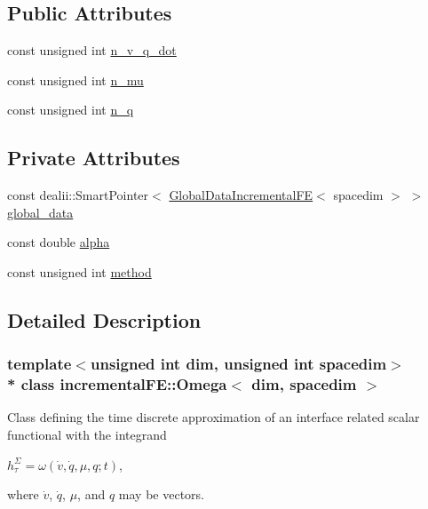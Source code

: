 \subsection*{Public Attributes}
\begin{DoxyCompactItemize}
\item 
const unsigned int \hyperlink{classincremental_f_e_1_1_omega_a7fa938b26804b0dc15726f3423332880}{n\+\_\+v\+\_\+q\+\_\+dot}
\item 
const unsigned int \hyperlink{classincremental_f_e_1_1_omega_a322340b50451ab46f91cdcec95248f16}{n\+\_\+mu}
\item 
const unsigned int \hyperlink{classincremental_f_e_1_1_omega_addbf75c949792f6340ea40164a2bfee3}{n\+\_\+q}
\end{DoxyCompactItemize}
\subsection*{Private Attributes}
\begin{DoxyCompactItemize}
\item 
const dealii\+::\+Smart\+Pointer$<$ \hyperlink{classincremental_f_e_1_1_global_data_incremental_f_e}{Global\+Data\+Incremental\+FE}$<$ spacedim $>$ $>$ \hyperlink{classincremental_f_e_1_1_omega_abd23d288a7a4a43f9b528be968cd2113}{global\+\_\+data}
\item 
const double \hyperlink{classincremental_f_e_1_1_omega_a891688560ec0ad8dc5a0058a7b400269}{alpha}
\item 
const unsigned int \hyperlink{classincremental_f_e_1_1_omega_a7600d263ebf98129629e44fa67e8a58c}{method}
\end{DoxyCompactItemize}


\subsection{Detailed Description}
\subsubsection*{template$<$unsigned int dim, unsigned int spacedim$>$\\*
class incremental\+F\+E\+::\+Omega$<$ dim, spacedim $>$}

Class defining the time discrete approximation of an interface related scalar functional with the integrand

$ h^\Sigma_\tau = \omega(\dot{v}, \dot{q}, \mu, q; t) $,

where $\dot{v}$, $\dot{q}$, $\mu$, and $q$ may be vectors.

